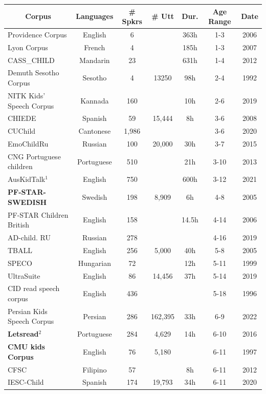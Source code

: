 \begin{table}
\small
\begin{tabular}{l|c|c|c|c|c|c} 
\hline
\multicolumn{1}{c|}{\textbf{Corpus}} & \multicolumn{1}{c|}{\textbf{Languages}} & \multicolumn{1}{c|}{\textbf{\# Spkrs}} & \multicolumn{1}{c|}{\textbf{\# Utt}} & \multicolumn{1}{c|}{\textbf{Dur.}} & \multicolumn{1}{c|}{\textbf{Age Range}} & \multicolumn{1}{c}{\textbf{Date}} \\ 
\hline
Providence Corpus \cite{providence} & English & 6 &  & 363h & 1-3 & 2006 \\ 
\hline
Lyon Corpus \cite{LyonSC} & French & 4 &  & 185h & 1-3 & 2007 \\ 
\hline
CASS\_CHILD \cite{cass_child} & Mandarin & 23 &  & 631h & 1-4 & 2012 \\ 
\hline
Demuth Sesotho Corpus \cite{demuth1992acquisition} & Sesotho & 4 & 13250 & 98h & 2-4 & 1992 \\ 
\hline
NITK Kids’ Speech Corpus \cite{nitk} & Kannada & 160 &  & 10h & 2-6 & 2019 \\ 
\hline
CHIEDE \cite{chiede} & Spanish & 59 & 15,444 & 8h & 3-6 & 2008 \\ 
\hline
CUChild \cite{cuchild} & Cantonese & 1,986 &  &  & 3-6 & 2020 \\ 
\hline
EmoChildRu \cite{emochildru} & Russian & 100 & 20,000 & 30h & 3-7 & 2015 \\ 
\hline
CNG Portuguese children\cite{hamalainen2013cng} & Portuguese & 510 &  & 21h & 3-10 & 2013 \\ 
\hline
AusKidTalk$^1$ \cite{ahmed2021auskidtalk} & English & 750 &  & 600h & 3-12 & 2021 \\ 
\hline
\textbf{PF-STAR-SWEDISH} \cite{pfstar}
& Swedish & 198 & 8,909 & 6h & 4-8 & 2005 \\ 
\hline
PF-STAR Children British \cite{pfstar,russell2006pf,pf-star-british} & English & 158 &  & 14.5h & 4-14 & 2006 \\ 
\hline
AD-child. RU \cite{ad-child_ru} & Russian & 278 &  &  & 4-16 & 2019 \\ 
\hline
TBALL \cite{tball} & English & 256 & 5,000 & 40h & 5-8 & 2005 \\ 
\hline
SPECO \cite{speco} & Hungarian & 72 &  & 12h & 5-11 & 1999 \\ 
\hline
UltraSuite\cite{eshky2019ultrasuite} & English & 86 & 14,456 & 37h & 5-14 & 2019 \\ 
\hline
CID read speech corpus \cite{lee1999acoustics} & English & 436 &  &  & 5-18 & 1996 \\ 
\hline
Persian Kids Speech Corpus \cite{khanzadi2022persian} & Persian & 286 & 162,395 & 33h & 6-9 & 2022 \\ 
\hline
\textbf{Letsread$^2$} \cite{letsread} & Portuguese & 284 & 4,629 & 14h & 6-10 & 2016 \\ 
\hline
\textbf{CMU kids Corpus} \cite{cmu} & English & 76 & 5,180 &  & 6-11 & 1997 \\ 
\hline
CFSC \cite{CFSC} & Filipino & 57 &  & 8h & 6-11 & 2012 \\ 
\hline
IESC-Child \cite{PEREZESPINOSA202055} & Spanish & 174 & 19,793 & 34h & 6-11 & 2020 \\ 
\hline


\end{tabular}
\end{table}
